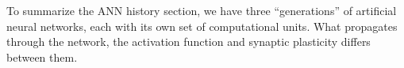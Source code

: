 












To summarize the ANN history section,  we have three ``generations'' of artificial neural networks, each with its own set of computational units. %
What propagates through the network, the activation function and synaptic plasticity differs between them. 

